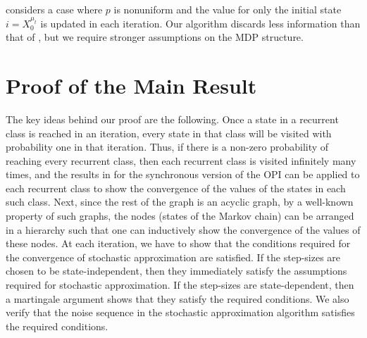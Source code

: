 \documentclass[12pt]{article}
\begin{document}
\cite{tsitsiklis2002convergence} considers a case where $p$ is nonuniform and the value for only the initial state $i = X_0^{\mu_t}$ is updated in each iteration. Our algorithm discards less information than that of \cite{tsitsiklis2002convergence}, but we require stronger assumptions on the MDP structure.


\section{Proof of the Main Result}





The key ideas behind our proof are the following. Once a state in a recurrent class is reached in an iteration, every state in that class will be visited with probability one in that iteration. Thus, if there is a non-zero probability of reaching every recurrent class, then each recurrent class is visited infinitely many times, and the results in \cite{tsitsiklis2002convergence} for the synchronous version of the OPI can be applied to each recurrent class to show the convergence of the values of the states in each such class. Next, since the rest of the graph is an acyclic graph, by a well-known property of such graphs, the nodes (states of the Markov chain) can be arranged in a hierarchy such that one can inductively show the convergence of the values of these nodes. At each iteration, we have to show that the conditions required for the convergence of stochastic approximation are satisfied. If the step-sizes are chosen to be state-independent, then they immediately satisfy the assumptions required for stochastic approximation. If the step-sizes are state-dependent, then a martingale argument shows that they satisfy the required conditions. We also verify that the noise sequence in the stochastic approximation algorithm satisfies the required conditions.
\end{document}
